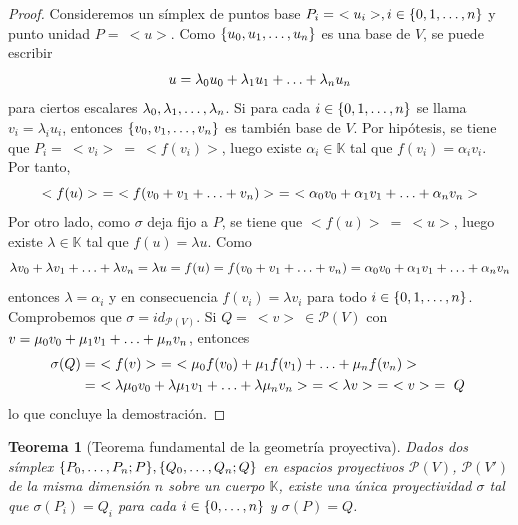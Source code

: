 \documentclass[12pt]{report}
\newtheorem{theorem}{Teorema}[chapter]
\theoremstyle{definition}
\theoremstyle{definition}
\theoremstyle{remark}
\begin{document}
\begin{proof}
    Consideremos un símplex de puntos base $P_i = \ <u_i>, i \in \{0,1,\mathellipsis,n\}$ y punto unidad $P = \ <u>$. Como $\{u_0,u_1,\mathellipsis,u_n\}$ es una base de $V$, se puede escribir
    \[u = \lambda_0u_0+\lambda_1u_1+\mathellipsis+\lambda_nu_n\]
    para ciertos escalares $\lambda_0,\lambda_1,\mathellipsis,\lambda_n$. Si para cada $i \in \{0,1,\mathellipsis,n\}$ se llama $v_i = \lambda_iu_i$, entonces $\{v_0,v_1,\mathellipsis,v_n\}$ es también base de $V$. Por hipótesis, se tiene que $P_i = \ <v_i> \ = \ <f(v_i)>$, luego existe $\alpha_i \in \mathbb{K}$ tal que $f(v_i) = \alpha_i v_i$. Por tanto,
    \[
    <f(u)> \ = \ < f(v_0+v_1+\mathellipsis+v_n) > \ = \ <\alpha_0v_0+\alpha_1v_1+\mathellipsis+\alpha_nv_n>
    \]
    Por otro lado, como $\sigma$ deja fijo a $P$, se tiene que $<f(u)> \ = \ <u>$, luego existe $\lambda \in 
    \mathbb{K}$ tal que $f(u) = \lambda u$. Como
    \[\lambda v_0+\lambda v_1+\mathellipsis+\lambda v_n = \lambda u = f(u) = f(v_0+v_1+\mathellipsis+v_n) = \alpha_0v_0+\alpha_1v_1+\mathellipsis+\alpha_nv_n\]
    entonces $\lambda = \alpha_i$ y en consecuencia $f(v_i) = \lambda v_i$ para todo $i \in \{0,1,\mathellipsis,n\}$. Comprobemos que $\sigma = id_{\mathcal{P}(V)}$. Si $Q = \ <v> \ \in \mathcal{P}(V)$ con $v = \mu_0v_0+\mu_1v_1+\mathellipsis+\mu_nv_n$, entonces
    \[
    \begin{aligned}[t]
    \sigma(Q) &= \ <f(v)> \ = \ <\mu_0f(v_0)+\mu_1f(v_1)+\mathellipsis+\mu_nf(v_n)> \ \\
    &= \ <\lambda\mu_0v_0+\lambda\mu_1v_1+\mathellipsis+\lambda\mu_nv_n> \ = \ <\lambda v> \ = \ <v> \ =  \ Q \
    \end{aligned}
    \]
lo que concluye la demostración.
\end{proof}

\begin{theorem}[Teorema fundamental de la geometría proyectiva]
\label{teo2.1.}
Dados dos símplex $\{P_0,\mathellipsis,P_n;P\}, \{Q_0,\mathellipsis,Q_n;Q\}$ en espacios proyectivos $\mathcal{P}(V)$, $\mathcal{P}(V')$ de la misma dimensión $n$ sobre un cuerpo $\mathbb{K}$, existe una única proyectividad $\sigma$ tal que $\sigma(P_i) = Q_i$ para cada $i \in \{0,\mathellipsis,n\}$ y $\sigma(P) = Q$.
\end{theorem}
\end{document}
